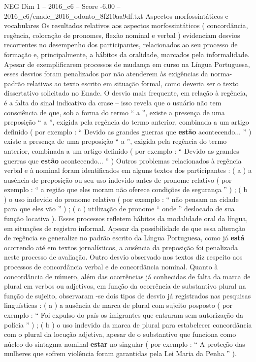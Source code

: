 \begin{textsample}{NEG Dim 1 – 2016\_c6 – Score -6.00 – 2016\_c6/enade\_2016\_odonto\_8f210aa9df.txt}
Aspectos morfossintáticos e vocabulares Os resultados relativos aos aspectos morfossintáticos ( concordância, regência, colocação de pronomes, flexão nominal e verbal ) evidenciam desvios recorrentes no desempenho dos participantes, relacionados ao seu processo de formação e, principalmente, a hábitos da oralidade, marcados pela informalidade.
Apesar de exemplificarem processos de mudança em curso na Língua Portuguesa, esses desvios foram penalizados por não atenderem às exigências da norma-padrão relativas ao texto escrito em situação formal, como deveria ser o texto dissertativo solicitado no Enade.
O desvio mais frequente, em relação à regência, é a falta do sinal indicativo da crase – isso revela que o usuário não tem consciência de que, sob a forma do termo “ a ”, existe a presença de uma preposição “ a ”, exigida pela regência do termo anterior, combinada a um artigo definido ( por exemplo : “ Devido as grandes guerras que \textbf{estão} acontecendo... ” ) existe a presença de uma preposição “ a ”, exigida pela regência do termo anterior, combinada a um artigo definido ( por exemplo : “ Devido as grandes guerras que \textbf{estão} acontecendo... ” ) Outros problemas relacionados à regência verbal e à nominal foram identificados em alguns textos dos participantes : ( a ) a ausência de preposição ou seu uso indevido antes de pronome relativo ( por exemplo : “ a região que eles moram não oferece condições de segurança ” ) ; ( b ) o uso indevido do pronome relativo ( por exemplo : “ não pensam na cidade para que eles vão ” ) ; ( c ) utilização de pronome “ onde ” deslocado de sua função locativa ).
Esses processos refletem hábitos da modalidade oral da língua, em situações de registro informal.
Apesar da possibilidade de que essa alteração de regência se generalize no padrão escrito da Língua Portuguesa, como já \textbf{está} ocorrendo até em textos jornalísticos, a ausência da preposição foi penalizada neste processo de avaliação.
Outro desvio observado nos textos diz respeito aos processos de concordância verbal e de concordância nominal.
Quanto à concordância de número, além das ocorrências já conhecidas de falta da marca de plural em verbos ou adjetivos, em função da ocorrência de substantivo plural na função de sujeito, observaram -se dois tipos de desvio já registrados nas pesquisas linguísticas : ( a ) a ausência de marca de plural com sujeito posposto ( por exemplo : “ Foi expulso do país os imigrantes que entraram sem autorização da polícia ” ) ; ( b ) o uso indevido da marca de plural para estabelecer concordância com o plural da locução adjetiva, apesar de o substantivo que funciona como núcleo do sintagma nominal \textbf{estar} no singular ( por exemplo : “ A proteção das mulheres que sofrem violência foram garantidas pela Lei Maria da Penha ” ).

\end{textsample}
